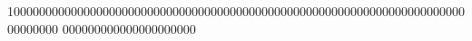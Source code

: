 10000000000000000000000000000000000000000000000000000000000000000000000000000000
000000000000000000000
